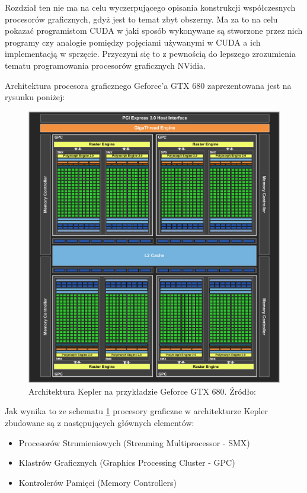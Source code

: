Rozdział ten nie ma na celu wyczerpującego opisania konstrukcji współczesnych
procesorów graficznych, gdyż jest to temat zbyt obszerny. Ma za to na celu
pokazać programistom CUDA w jaki sposób wykonywane są stworzone
przez nich programy czy analogie pomiędzy pojęciami używanymi w CUDA a ich
implementacją w sprzęcie. Przyczyni się to z pewnością do lepszego zrozumienia tematu
programowania procesorów graficznych NVidia.

Architektura procesora graficznego Geforce'a GTX 680 zaprezentowana jest na
rysunku poniżej:

\begin{figure}[H]
\centering
\includegraphics[scale=0.4]{images/kepler-overview.png}
\caption{Architektura Kepler na przykładzie Geforce GTX 680. Źródło: \cite{gf680}}
\label{gf880}
\end{figure}

Jak wynika to ze schematu \ref{gf880} procesory graficzne w architekturze Kepler
zbudowane są z następujących głównych elementów\cite{gf680}:
\begin{itemize}
\item Procesorów Strumieniowych (Streaming Multiprocessor - SMX)
\item Klastrów Graficznych (Graphics Processing Cluster - GPC)
\item Kontrolerów Pamięci (Memory Controllers)
\end{itemize}

